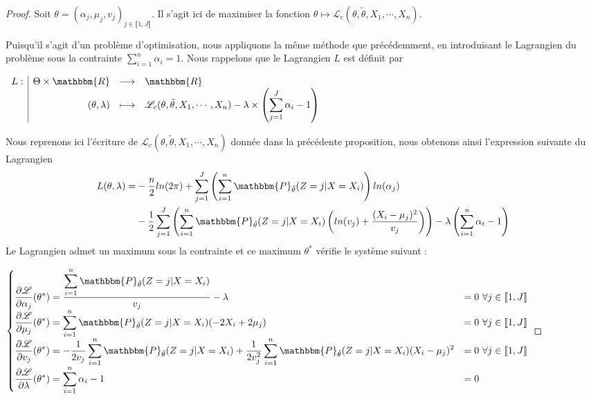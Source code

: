 \documentclass[frenchb]{report}
\newcommand{\R}{\mathbbm{R}}
\newcommand{\1}{\mathbbm{1}}
\newcommand{\prob}{\mathbbm{P}}
\newcommand{\lv}{\mathcal{L}}
\newcommand{\thetat}{\tilde{\theta}}
\theoremstyle{definition}\newtheorem{defn}{Définition}
\theoremstyle{definition}\newtheorem{exm}{Exemple}
\theoremstyle{definition}\newtheorem{nota}{Notation}
\theoremstyle{definition}\newtheorem{rem}{Remarque}
\begin{document}
\begin{proof}
Soit $\theta = (\alpha_j, \mu_j, v_j)_{j\in\llbracket1,J\rrbracket}$. Il s'agit ici de maximiser la fonction $\theta \mapsto \lv_{c}(\theta,\thetat, X_1, \cdots, X_n)$.

Puisqu'il s'agit d'un problème d'optimisation, nous appliquons la même méthode que précédemment, en introduisant le Lagrangien du problème sous la contrainte $\displaystyle\sum_{i=1}^n\alpha_i = 1$.
Nous rappelons que le Lagrangien $L$ est définit par

\begin{center}
$
\begin{array}{l|rcl}
L : & \Theta\times\R & \longrightarrow & \R \\
    & (\theta, \lambda) & \longmapsto & \mathcal{L}_c(\theta, \thetat, X_1, \cdots, X_n) - \lambda\times\left(\displaystyle\sum_{j=1}^J\alpha_i - 1\right)
\end{array}
$
\end{center}

Nous reprenons ici l'écriture de $\lv_c(\theta,\thetat,X_1, \cdots, X_n)$ donnée dans la précédente proposition, nous obtenons ainsi l'expression suivante du Lagrangien
\begin{align*}
L(\theta,\lambda) = &-\frac{n}{2}ln(2\pi)+\sum_{j=1}^J \left(\sum_{i = 1}^n  \prob_{\thetat}(Z=j|X=X_i)\right) ln(\alpha_j)\\
&-\frac{1}{2}\sum_{j=1}^J\left(\sum_{i=1}^n \prob_{\thetat}(Z=j|X=X_i)\left(ln(v_j)+\frac{(X_i-\mu_j)^2}{v_j}\right)\right) - \lambda\left(\sum_{i=1}^n\alpha_i-1\right)
\end{align*}
Le Lagrangien admet un maximum sous la contrainte et ce maximum $\theta^*$ vérifie le système suivant :

$
\begin{cases}
\displaystyle\frac{\partial \lv}{\partial \alpha_j} (\theta^*) = \frac{\displaystyle\sum_{i=1}^n \prob_{\thetat}(Z=j|X=X_i)}{v_j} - \lambda &=0 \text{ } \forall j \in \llbracket 1,J \rrbracket \\
\displaystyle\frac{\partial \lv}{\partial \mu_j} (\theta^*) = \displaystyle\sum_{i=1}^n \prob_{\thetat}(Z=j|X=X_i)(-2X_i+2\mu_j) &=0 \text{ } \forall j \in \llbracket 1,J \rrbracket \\
\displaystyle\frac{\partial \lv}{\partial v_j} (\theta^*) = -\displaystyle\frac{1}{2v_j}\sum_{i=1}^n \prob_{\thetat}(Z=j|X=X_i) + \frac{1}{2v_j^2}\sum_{i=1}^n \prob_{\thetat}(Z=j|X=X_i)(X_i-\mu_j)^2 &=0 \text{ } \forall j \in \llbracket 1,J \rrbracket \\
\displaystyle\frac{\partial \lv}{\partial \lambda} (\theta^*) = \sum_{i=1}^n\alpha_i-1 &=0 
\end{cases}
$


\end{proof}
\end{document}
